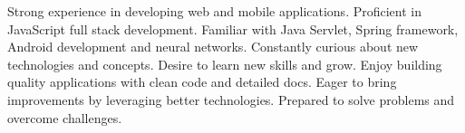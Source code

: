 

\begin{cvparagraph}

Strong experience in developing web and mobile applications. Proficient in JavaScript full stack development. Familiar with Java Servlet, Spring framework, Android development and neural networks. Constantly curious about new technologies and concepts. Desire to learn new skills and grow. Enjoy building quality applications with clean code and detailed docs.  Eager to bring improvements by leveraging better technologies. Prepared to solve problems and overcome challenges.
\end{cvparagraph}
